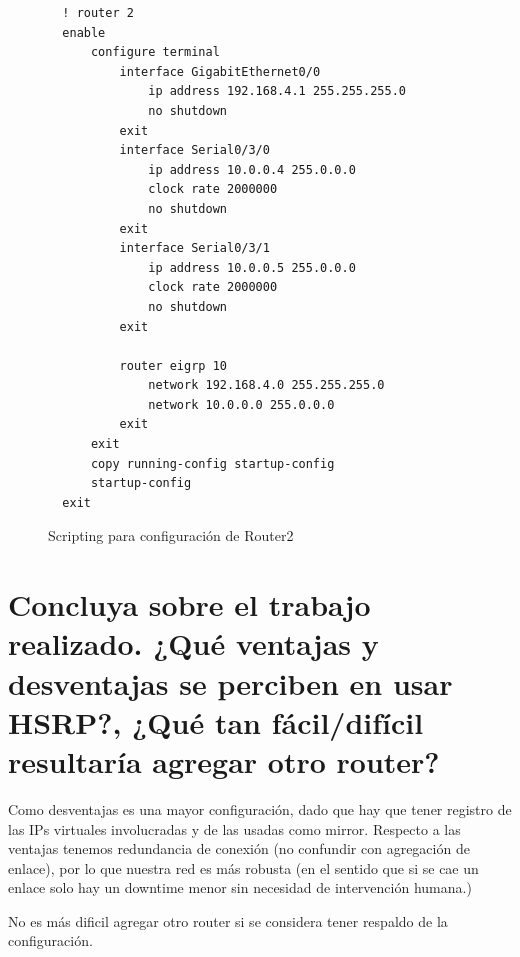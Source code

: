 \documentclass[11pt]{utalcaDoc}
\begin{document}
\begin{figure}[!ht]
\begin{lstlisting}
  ! router 2
  enable
      configure terminal
          interface GigabitEthernet0/0
              ip address 192.168.4.1 255.255.255.0
              no shutdown 
          exit
          interface Serial0/3/0
              ip address 10.0.0.4 255.0.0.0
              clock rate 2000000
              no shutdown 
          exit
          interface Serial0/3/1
              ip address 10.0.0.5 255.0.0.0
              clock rate 2000000
              no shutdown 
          exit
  
          router eigrp 10
              network 192.168.4.0 255.255.255.0
              network 10.0.0.0 255.0.0.0
          exit
      exit
      copy running-config startup-config
      startup-config 
  exit
\end{lstlisting}
\label{FIG:ROUTER2}
\caption{Scripting para configuración de Router2}
\end{figure}
      
\section{Concluya sobre el trabajo realizado. ¿Qu\'e ventajas y desventajas se perciben en usar HSRP?, ¿Qu\'e tan f\'acil/dif\'icil resultar\'ia agregar otro router?}

Como desventajas es una mayor configuración, dado que hay que tener registro de las IPs virtuales involucradas y de las usadas como mirror. Respecto a las ventajas tenemos redundancia de conexión (no confundir con agregación de enlace), por lo que nuestra red es más robusta (en el sentido que si se cae un enlace solo hay un downtime menor sin necesidad de intervención humana.)

No es más dificil agregar otro router si se considera tener respaldo de la configuración.
\end{document}
